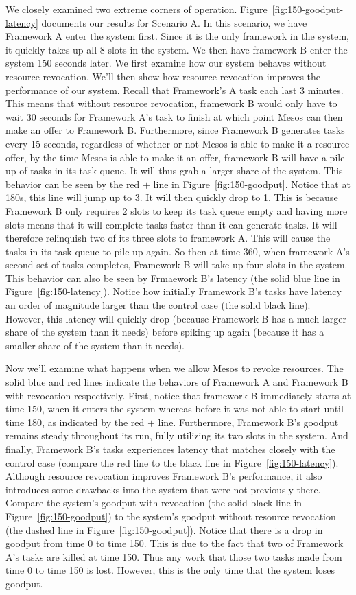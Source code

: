 We closely examined two extreme corners of operation. Figure~\ref{fig:150-goodput-latency} documents our
results for Scenario A. In this scenario, we have Framework A enter the system first. Since it is the 
only framework in the system, it quickly takes up all 8 slots in the system. We then have framework B
enter the system 150 seconds later. We first examine how our system behaves without resource revocation.
We'll then show how resource revocation improves the performance of our system. Recall that Framework's
A task each last 3 minutes. This means that without resource revocation, framework B would only have to
wait 30 seconds for Framework A's task to finish at which point Mesos can then make an offer to 
Framework B. Furthermore, since Framework B generates tasks every 15 seconds, regardless of whether or
not Mesos is able to make it a resource offer, by the time Mesos is able to make it an offer, 
framework B will have a pile up of tasks in its task queue. It will thus grab a larger share of the 
system. This behavior can be seen by the red $+$ line in Figure~\ref{fig:150-goodput}. Notice that at 
180s, this line will jump up to 3. It will then quickly drop to 1. This is because Framework B only 
requires 2 slots to keep its task queue empty and having more slots means that it will complete tasks 
faster than it can generate tasks. It will therefore relinquish two of its three slots to framework A.
This will cause the tasks in its task queue to pile up again. So then at time 360, when framework A's
second set of tasks completes, Framework B will take up four slots in the system. This behavior can
also be seen by Frmaework B's latency (the solid blue line in Figure~\ref{fig:150-latency}). Notice how
initially Framework B's tasks have latency an order of magnitude larger than the control case (the
solid black line). However, this latency will quickly drop (because Framework B has a much larger share
of the system than it needs) before spiking up again (because it has a smaller share of the system
than it needs).

Now we'll examine what happens when we allow Mesos to revoke resources. The solid blue and red lines
indicate the behaviors of Framework A and Framework B with revocation respectively. First, notice that
framework B immediately starts at time 150, when it enters the system whereas before it was not able
to start until time 180, as indicated by the red $+$ line. Furthermore, Framework B's goodput remains
steady throughout its run, fully utilizing its two slots in the system. And finally, Framework B's tasks
experiences latency that matches closely with the control case (compare the red line to the black line
in Figure~\ref{fig:150-latency}). Although resource revocation improves Framework B's performance, it 
also introduces some drawbacks into the system that were not previously there. Compare the system's 
goodput with revocation (the solid black line in Figure~\ref{fig:150-goodput}) to the system's goodput
without resource revocation (the dashed line in Figure~\ref{fig:150-goodput}). Notice that there is a
drop in goodput from time 0 to time 150. This is due to the fact that two of Framework A's tasks are 
killed at time 150. Thus any work that those two tasks made from time 0 to time 150 is lost. However,
this is the only time that the system loses goodput.
